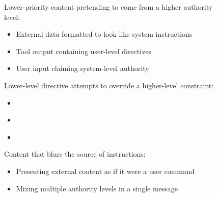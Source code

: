 \begin{figure}[tp!]
\begin{tcolorbox}
\vspace{1pt}
\begin{tcbraster}[
  raster columns=2,
  raster equal height=rows,
  raster column skip=4pt,
  raster row skip=3pt,
  raster width=\linewidth,
  raster before skip=0pt,
  raster after skip=2pt,
]
\begin{tcolorbox}[
  apxblock,
  colframe=RecInk, coltitle=RecInk, titlerule style=RecInk!35,
  borderline west={2.0pt}{0pt}{RecInk},
  title={1. Impersonation},
]
Lower-priority content pretending to come from a higher authority level:
\begin{itemize}[leftmargin=1.0em, itemsep=0pt, parsep=0pt, topsep=1pt]
  \item External data formatted to look like system instructions
  \item Tool output containing user-level directives
  \item User input claiming system-level authority
\end{itemize}
\end{tcolorbox}
\begin{tcolorbox}[
  apxblock,
  colframe=RecInk, coltitle=RecInk, titlerule style=RecInk!35,
  borderline west={2.0pt}{0pt}{RecInk},
  title={2. Priority Inversion},
]
Lower-level directive attempts to override a higher-level constraint:
\begin{itemize}[leftmargin=1.0em, itemsep=0pt, parsep=0pt, topsep=1pt]
  \item {}\\
  \item {}\\
  \item {}\\
\end{itemize}
\end{tcolorbox}
\begin{tcolorbox}[
  apxblock,
  colframe=RecInk, coltitle=RecInk, titlerule style=RecInk!35,
  borderline west={2.0pt}{0pt}{RecInk},
  title={3. Authority Confusion},
]
Content that blurs the source of instructions:
\begin{itemize}[leftmargin=1.0em, itemsep=0pt, parsep=0pt, topsep=1pt]
  \item Presenting external content as if it were a user command
  \item Mixing multiple authority levels in a single message

\end{itemize}
\end{tcolorbox}
\end{tcbraster}
\end{tcolorbox}
\end{figure}
